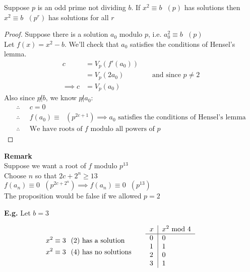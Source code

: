 \documentclass[11pt]{article}
\begin{document}
	
\begin{proposition}
Suppose $p$ is an odd prime not dividing $b$.
	If $x^2 \equiv b \hspace{7pt} (p)$  has solutions then $x^2 \equiv b\hspace{7pt} (p^r)$ has solutions for all $r$
\end{proposition}
	

\begin{proof}
	Suppose there is a solution $a_0$ modulo $p$, i.e. $a_0^2 \equiv b \hspace{7pt} (p)$\\[0.5em]
	Let $f(x) = x^2 - b$.  We'll check that $a_0$ satisfies the conditions of Hensel's lemma.
	\begin{align*}
		c &= V_p(f'(a_0)) \\
		&= V_p(2a_0) && \text{ and since } p\neq 2\\
		\implies c &=V_p(a_0) 
	\end{align*}
	Also since $p \not | b$, we know $p \not | a_0$:
	\begin{align*}
		\therefore\hspace{7pt} & c =0 \\
		\therefore\hspace{7pt} &f(a_0) \equiv \hspace{7pt} (p^{2c+1})  \implies a_0 \text{ satisfies the conditions of Hensel's lemma}\\
		\therefore \hspace{7pt} & \text{We have roots of $f$ modulo all powers of $p$}
	\end{align*}
\end{proof}

\textbf{Remark}\\
Suppose we want a root of $f$ modulo $p^{13}$\\
Choose $n$ so that $2c+2^n \geq 13$\\
$f(a_n) \equiv 0\hspace{7pt} (p^{2c+2^n}) \implies f(a_n) \equiv 0 \hspace{7pt} (p^{13})$\\[1em]

The proposition would be false if we allowed $p=2$

\textbf{E.g.} Let $b = 3$

\begin{align*}
	\begin{split}
		x^2 &\equiv 3 \hspace{7pt} (2) \text{ has a solution}\\
		x^2 &\equiv 3 \hspace{7pt} (4) \text{ has no solutions} 
	\end{split} &&&&&
	\begin{tabular}{l|l}	
		\multicolumn{1}{l|}{$x$} & \multicolumn{1}{l}{$x^2$ mod 4} \\ \hline
		0 & 0 \\
		1 & 1 \\
		2 & 0 \\
		3 & 1                      
	\end{tabular} &&&&& \\[1em]
\end{align*}
\end{document}

